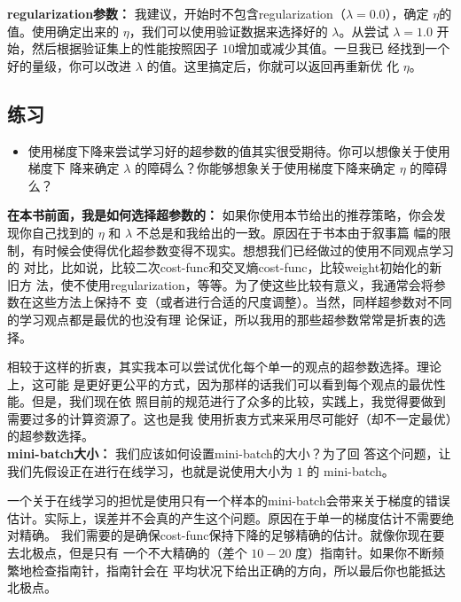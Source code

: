 \textbf{\gls*{regularization}参数：} 我建议，开始时不包含\gls*{regularization}（$\lambda=0.0$），确定 $\eta$的
值。使用确定出来的 $\eta$，我们可以使用验证数据来选择好的 $\lambda$。从尝试
$\lambda=1.0$ 开始，然后根据验证集上的性能按照因子 $10$增加或减少其值。一旦我已
经找到一个好的量级，你可以改进 $\lambda$ 的值。这里搞定后，你就可以返回再重新优
化 $\eta$。

\subsection*{练习}

\begin{itemize}
\item 使用梯度下降来尝试学习好的超参数的值其实很受期待。你可以想像关于使用梯度下
  降来确定 $\lambda$ 的障碍么？你能够想象关于使用梯度下降来确定 $\eta$ 的障碍么？
\end{itemize}

\textbf{在本书前面，我是如何选择超参数的：} 如果你使用本节给出的推荐策略，你会发
现你自己找到的 $\eta$ 和 $\lambda$ 不总是和我给出的一致。原因在于书本由于叙事篇
幅的限制，有时候会使得优化超参数变得不现实。想想我们已经做过的使用不同观点学习的
对比，比如说，比较二次\gls*{cost-func}和交叉熵\gls*{cost-func}，比较\gls*{weight}初始化的新旧方
法，使不使用\gls*{regularization}，等等。为了使这些比较有意义，我通常会将参数在这些方法上保持不
变（或者进行合适的尺度调整）。当然，同样超参数对不同的学习观点都是最优的也没有理
论保证，所以我用的那些超参数常常是折衷的选择。

相较于这样的折衷，其实我本可以尝试优化每个单一的观点的超参数选择。理论上，这可能
是更好更公平的方式，因为那样的话我们可以看到每个观点的最优性能。但是，我们现在依
照目前的规范进行了众多的比较，实践上，我觉得要做到需要过多的计算资源了。这也是我
使用折衷方式来采用尽可能好（却不一定最优）的超参数选择。\\

\label{mini_batch_size}
\textbf{\gls*{mini-batch}大小：} 我们应该如何设置\gls*{mini-batch}的大小？为了回
答这个问题，让我们先假设正在进行在线学习，也就是说使用大小为 $1$ 的%
\gls*{mini-batch}。

一个关于在线学习的担忧是使用只有一个样本的\gls*{mini-batch}会带来关于梯度的错误
估计。实际上，误差并不会真的产生这个问题。原因在于单一的梯度估计不需要绝对精确。
我们需要的是确保\gls*{cost-func}保持下降的足够精确的估计。就像你现在要去北极点，但是只有
一个不大精确的（差个 $10-20$ 度）指南针。如果你不断频繁地检查指南针，指南针会在
平均状况下给出正确的方向，所以最后你也能抵达北极点。


